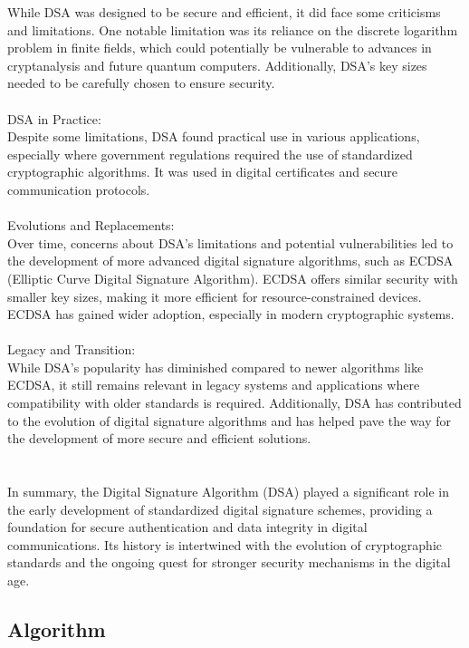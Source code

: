 \documentclass{report}
\begin{document}
While DSA was designed to be secure and efficient, it did face some criticisms and limitations. One notable limitation was its reliance on the discrete logarithm problem in finite fields, which could potentially be vulnerable to advances in cryptanalysis and future quantum computers. Additionally, DSA's key sizes needed to be carefully chosen to ensure security.\\
\\
DSA in Practice:\\
Despite some limitations, DSA found practical use in various applications, especially where government regulations required the use of standardized cryptographic algorithms. It was used in digital certificates and secure communication protocols.\\
\\
Evolutions and Replacements:\\
Over time, concerns about DSA's limitations and potential vulnerabilities led to the development of more advanced digital signature algorithms, such as ECDSA (Elliptic Curve Digital Signature Algorithm). ECDSA offers similar security with smaller key sizes, making it more efficient for resource-constrained devices. ECDSA has gained wider adoption, especially in modern cryptographic systems.\\
\\
Legacy and Transition:\\
While DSA's popularity has diminished compared to newer algorithms like ECDSA, it still remains relevant in legacy systems and applications where compatibility with older standards is required. Additionally, DSA has contributed to the evolution of digital signature algorithms and has helped pave the way for the development of more secure and efficient solutions.\\
\\
\\
In summary, the Digital Signature Algorithm (DSA) played a significant role in the early development of standardized digital signature schemes, providing a foundation for secure authentication and data integrity in digital communications. Its history is intertwined with the evolution of cryptographic standards and the ongoing quest for stronger security mechanisms in the digital age.
\subsection{Algorithm}
\end{document}
